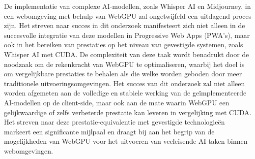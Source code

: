 De implementatie van complexe AI-modellen, zoals Whisper AI en Midjourney, 
in een webomgeving met behulp van WebGPU zal ongetwijfeld een uitdagend proces zijn. 
Het streven naar succes in dit onderzoek manifesteert zich niet alleen in de succesvolle integratie van deze modellen in Progressive Web Apps (PWA's), 
maar ook in het bereiken van prestaties op het niveau van gevestigde systemen, zoals Whisper AI met CUDA. 
De complexiteit van deze taak wordt benadrukt door de noodzaak om de rekenkracht van WebGPU te optimaliseren, 
waarbij het doel is om vergelijkbare prestaties te behalen als die welke worden geboden door meer traditionele uitvoeringsomgevingen. 
Het succes van dit onderzoek zal niet alleen worden afgemeten aan de volledige en stabiele werking van de geïmplementeerde AI-modellen op de client-side, 
maar ook aan de mate waarin WebGPU een gelijkwaardige of zelfs verbeterde prestatie kan leveren in vergelijking met CUDA. 
Het streven naar deze prestatie-equivalentie met gevestigde technologieën markeert een significante mijlpaal 
en draagt bij aan het begrip van de mogelijkheden van WebGPU voor het uitvoeren van veeleisende AI-taken binnen webomgevingen.
